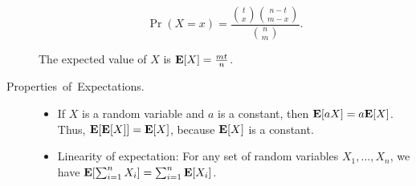 \documentclass[11pt]{article}
\theoremstyle{mytheoremstyle}
\begin{document}
\begin{description}
	\[\Pr(X=x) = \frac{\binom{t}{x}\binom{n-t}{m-x}}{\binom{n}{m}}.\]
	
	The expected value of $X$ is $\mathrm{\mathbf{E}}[X] = \frac{mt}{n}$.

	\item [{Properties~of~Expectations.}] 
	
	\begin{itemize}
		\item If $X$ is a random variable and $a$ is a constant, then $\mathrm{\mathbf{E}}[aX]=a\mathrm{\mathbf{E}}[X]$.
		Thus, $\mathrm{\mathrm{\mathbf{E}}}[\mathrm{\mathbf{E}}[X]]=\mathrm{\mathbf{E}}[X]$, because $\mathrm{\mathbf{E}}[X]$ is a constant.
		\item Linearity of expectation: For any set of random variables $X_{1},...,X_{n}$,
		we have $\mathrm{\mathbf{E}}[\sum_{i=1}^{n}X_{i}]=\sum_{i=1}^{n}\mathrm{\mathbf{E}}[X_{i}]$.
	\end{itemize}
\end{description}
\end{document}
